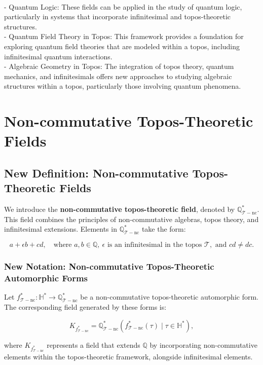 \documentclass{article}
\begin{document}
{\ }\\
- Quantum Logic: These fields can be applied in the study of quantum logic, particularly in systems that incorporate infinitesimal and topos-theoretic structures.
{\ }\\
- Quantum Field Theory in Topos: This framework provides a foundation for exploring quantum field theories that are modeled within a topos, including infinitesimal quantum interactions.
{\ }\\
- Algebraic Geometry in Topos: The integration of topos theory, quantum mechanics, and infinitesimals offers new approaches to studying algebraic structures within a topos, particularly those involving quantum phenomena.


\section{Non-commutative Topos-Theoretic Fields}
\subsection{New Definition: Non-commutative Topos-Theoretic Fields}
We introduce the \textbf{non-commutative topos-theoretic field}, denoted by \(\mathbb{Q}_{\mathcal{T}-\text{nc}}^*\). This field combines the principles of non-commutative algebras, topos theory, and infinitesimal extensions. Elements in \(\mathbb{Q}_{\mathcal{T}-\text{nc}}^*\) take the form:

\[
a + \epsilon b + cd, \quad \text{where } a, b \in \mathbb{Q}, \ \epsilon \text{ is an infinitesimal in the topos } \mathcal{T}, \text{ and } cd \neq dc.
\]

\subsubsection{New Notation: Non-commutative Topos-Theoretic Automorphic Forms}
Let \(f_{\mathcal{T}-\text{nc}}^*: \mathbb{H}^* \to \mathbb{Q}_{\mathcal{T}-\text{nc}}^*\) be a non-commutative topos-theoretic automorphic form. The corresponding field generated by these forms is:

\[
K_{f_{\mathcal{T}-\text{nc}}^*} = \mathbb{Q}_{\mathcal{T}-\text{nc}}^*(f_{\mathcal{T}-\text{nc}}^*(\tau) \mid \tau \in \mathbb{H}^*),
\]

where \(K_{f_{\mathcal{T}-\text{nc}}^*}\) represents a field that extends \(\mathbb{Q}\) by incorporating non-commutative elements within the topos-theoretic framework, alongside infinitesimal elements.
\end{document}
